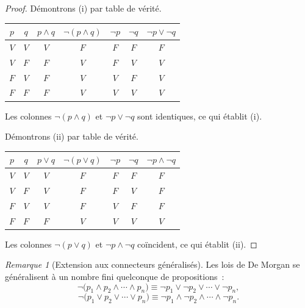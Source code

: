 \documentclass[12pt,a4paper,openany]{book}
\theoremstyle{definition}
\theoremstyle{plain}
\theoremstyle{remark}
\newtheorem{remarque}[definition]{Remarque}
\begin{document}
\begin{proof}
  D\'emontrons (i) par table de v\'erit\'e.
  \begin{center}
  \begin{tabular}{cc|c|c|c|c|c}
    \toprule
    $p$ & $q$ & $p \land q$ & $\neg(p \land q)$ & $\neg p$ & $\neg q$ & $\neg p \lor \neg q$ \\
    \midrule
    $V$ & $V$ & $V$ & $F$ & $F$ & $F$ & $F$ \\
    $V$ & $F$ & $F$ & $V$ & $F$ & $V$ & $V$ \\
    $F$ & $V$ & $F$ & $V$ & $V$ & $F$ & $V$ \\
    $F$ & $F$ & $F$ & $V$ & $V$ & $V$ & $V$ \\
    \bottomrule
  \end{tabular}
  \end{center}
  Les colonnes $\neg(p \land q)$ et $\neg p \lor \neg q$ sont identiques, ce qui \'etablit (i).

  \medskip
  D\'emontrons (ii) par table de v\'erit\'e.
  \begin{center}
  \begin{tabular}{cc|c|c|c|c|c}
    \toprule
    $p$ & $q$ & $p \lor q$ & $\neg(p \lor q)$ & $\neg p$ & $\neg q$ & $\neg p \land \neg q$ \\
    \midrule
    $V$ & $V$ & $V$ & $F$ & $F$ & $F$ & $F$ \\
    $V$ & $F$ & $V$ & $F$ & $F$ & $V$ & $F$ \\
    $F$ & $V$ & $V$ & $F$ & $V$ & $F$ & $F$ \\
    $F$ & $F$ & $F$ & $V$ & $V$ & $V$ & $V$ \\
    \bottomrule
  \end{tabular}
  \end{center}
  Les colonnes $\neg(p \lor q)$ et $\neg p \land \neg q$ co\"incident, ce qui \'etablit (ii).
\end{proof}

\begin{remarque}[Extension aux connecteurs g\'en\'eralis\'es]\label{rem:de-morgan-gen}
  Les lois de De Morgan se g\'en\'eralisent \`a un nombre fini quelconque de propositions~:
  \[
    \neg\bigl(p_1 \land p_2 \land \cdots \land p_n\bigr)
    \equiv \neg p_1 \lor \neg p_2 \lor \cdots \lor \neg p_n,
  \]
  \[
    \neg\bigl(p_1 \lor p_2 \lor \cdots \lor p_n\bigr)
    \equiv \neg p_1 \land \neg p_2 \land \cdots \land \neg p_n.
  \]
\end{remarque}

\end{document}
